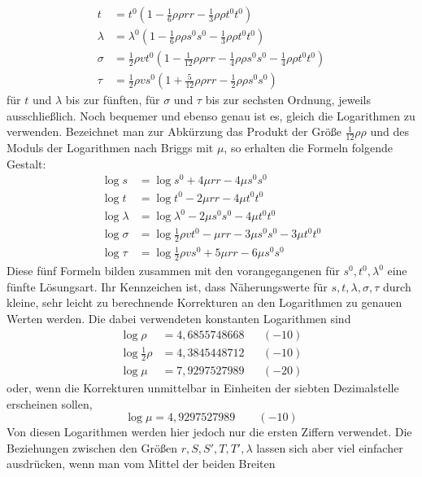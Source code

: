 %
\[
\begin{aligned}
t&=t^0(1-\tfrac{1}{6}\rho\rho rr-\tfrac{1}{3}\rho\rho t^0t^0)\\
\lambda&=\lambda^0(1-\tfrac{1}{6}\rho\rho s^0s^0-\tfrac{1}{3}\rho\rho t^0t^0)\\
\sigma&=\tfrac{1}{2}\rho vt^0(1-\tfrac{1}{12}\rho\rho rr-\tfrac{1}{4}\rho\rho s^0s^0-\tfrac{1}{4}\rho\rho t^0t^0)\\
\tau&=\tfrac{1}{2}\rho vs^0(1+\tfrac{5}{12}\rho\rho rr-\tfrac{1}{2}\rho\rho s^0s^0)
\end{aligned}
\]
für \(t\) und \(\lambda\) bis zur fünften, für \(\sigma\) und \(\tau\) bis zur sechsten Ordnung, jeweils ausschließlich. Noch bequemer und ebenso genau ist es, gleich die Logarithmen zu verwenden. Bezeichnet man zur Abkürzung das Produkt der Größe \(\tfrac{1}{12}\rho\rho\) und des Moduls der Logarithmen nach Briggs mit \(\mu\), so erhalten die Formeln folgende Gestalt:
\[
\begin{aligned}
\log s&=\log s^0+4\mu rr-4\mu s^0s^0\\
\log t&=\log t^0-2\mu rr-4\mu t^0t^0\\
\log\lambda&=\log\lambda^0-2\mu s^0s^0-4\mu t^0t^0\\
\log\sigma&=\log\tfrac{1}{2}\rho vt^0-\mu rr-3\mu s^0s^0-3\mu t^0t^0\\
\log\tau&=\log\tfrac{1}{2}\rho vs^0+5\mu rr-6\mu s^0s^0
\end{aligned}
\]
\indent Diese fünf Formeln bilden zusammen mit den vorangegangenen für \(s^0,t^0,\lambda^0\) eine fünfte Lösungsart. Ihr Kennzeichen ist, dass Näherungswerte für \(s,t,\lambda,\sigma,\tau\) durch kleine, sehr leicht zu berechnende Korrekturen an den Logarithmen zu genauen Werten werden. Die dabei verwendeten konstanten Logarithmen sind
\[
\begin{aligned}
\log\rho&=4{,}6855748668&&(-10)\\
\log\tfrac{1}{2}\rho&=4{,}3845448712&&(-10)\\
\log\mu&=7{,}9297527989&&(-20)
\end{aligned}
\]
oder, wenn die Korrekturen unmittelbar in Einheiten der siebten Dezimalstelle erscheinen sollen,
\[
\log\mu=4{,}9297527989\qquad(-10)
\]
Von diesen Logarithmen werden hier jedoch nur die ersten Ziffern verwendet.
Die Beziehungen zwischen den Größen \(r,S,S',T,T',\lambda\) lassen sich aber viel einfacher ausdrücken, wenn man vom Mittel der beiden Breiten
